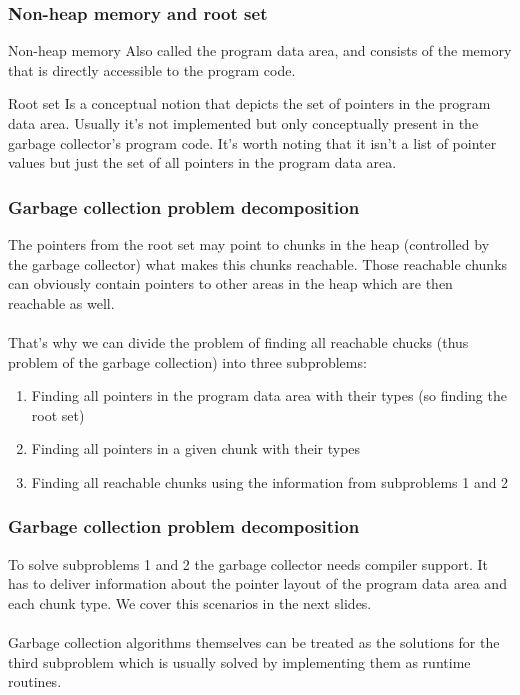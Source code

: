 \documentclass[presentation]{beamer}
\begin{document}
\begin{frame}
    \frametitle{Non-heap memory and root set}
    \begin{block}{Non-heap memory}
    \justifying
    Also called the program data area, and consists of the memory that is directly accessible to the program code.
    \end{block}
    
    \begin{block}{Root set}
    \justifying
    Is a conceptual notion that depicts the set of pointers in the program data area. Usually it's not implemented but only conceptually present in the garbage collector's program code. It's worth noting that it isn't a list of pointer values but just the set of all pointers in the program data area.
    \end{block}
\end{frame}

\begin{frame}
    \frametitle{Garbage collection problem decomposition}
    \justifying
    The pointers from the root set may point to chunks in the heap (controlled by the garbage collector) what makes this chunks reachable. Those reachable chunks can obviously contain pointers to other areas in the heap which are then reachable as well.
    \\~\\
    That's why we can divide the problem of finding all reachable chucks (thus problem of the garbage collection) into three subproblems:
    
    \begin{enumerate}
        \item Finding all pointers in the program data area with their types (so finding the root set)
        \item Finding all pointers in a given chunk with their types
        \item Finding all reachable chunks using the information from subproblems 1 and 2
    \end{enumerate}
\end{frame}

\begin{frame}
    \frametitle{Garbage collection problem decomposition}
    \justifying
    To solve subproblems 1 and 2 the garbage collector needs compiler support. It has to deliver information about the pointer layout of the program data area and each chunk type. We cover this 
    scenarios in the next slides.
    \\~\\
    Garbage collection algorithms themselves can be treated as the solutions for the third subproblem which is usually solved by implementing them as runtime routines.
\end{frame}
\end{document}
